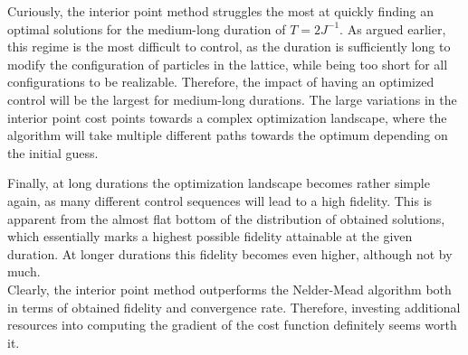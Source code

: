 Curiously, the interior point method struggles the most at quickly finding an optimal solutions for the medium-long duration of $T = 2 J^{-1}$. As argued earlier, this regime is the most difficult to control, as the duration is sufficiently long to modify the configuration of particles in the lattice, while being too short for all configurations to be realizable. Therefore, the impact of having an optimized control will be the largest for medium-long durations. The large variations in the interior point cost points towards a complex optimization landscape, where the algorithm will take multiple different paths towards the optimum depending on the initial guess.

Finally, at long durations the optimization landscape becomes rather simple again, as many different control sequences will lead to a high fidelity. This is apparent from the almost flat bottom of the distribution of obtained solutions, which essentially marks a highest possible fidelity attainable at the given duration. At longer durations this fidelity becomes even higher, although not by much.\\

Clearly, the interior point method outperforms the Nelder-Mead algorithm both in terms of obtained fidelity and convergence rate. Therefore, investing additional resources into computing the gradient of the cost function definitely seems worth it.



